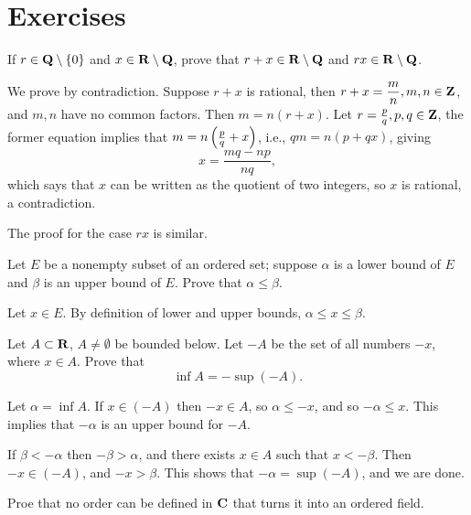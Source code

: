 \section*{Exercises}
\begin{prbm}
If $r\in\mathbf Q\setminus\{0\}$ and $x\in\mathbf R\setminus\mathbf Q$, prove that $r+x\in\mathbf R\setminus\mathbf Q$ and $rx\in\mathbf R\setminus\mathbf Q$.
\end{prbm}

\begin{solution}
We prove by contradiction. Suppose $r+x$ is rational, then $r+x=\dfrac{m}{n},m,n\in\mathbf Z$, and $m,n$ have no common factors. Then $m=n(r+x)$. Let $r=\frac{p}{q},p,q\in\mathbf Z$, the former equation implies that $m=n\left(\frac{p}{q}+x\right)$, i.e., $qm=n(p+qx)$, giving
\[x=\frac{mq-np}{nq},\]
which says that $x$ can be written as the quotient of two integers, so $x$ is rational, a contradiction.

The proof for the case $rx$ is similar.
\end{solution}

\begin{prbm}
Let $E$ be a nonempty subset of an ordered set; suppose $\alpha$ is a lower bound of $E$ and $\beta$ is an upper bound of $E$. Prove that $\alpha\le\beta$.
\end{prbm}

\begin{solution}
Let $x\in E$. By definition of lower and upper bounds, $\alpha\le x\le\beta$.
\end{solution}

\begin{prbm}
Let $A\subset\mathbf R$, $A\neq\emptyset$ be bounded below. Let $-A$ be the set of all numbers $-x$, where $x\in A$. Prove that
\[\inf A=-\sup(-A).\]
\end{prbm}

\begin{solution}
Let $\alpha=\inf A$. If $x\in(-A)$ then $-x\in A$, so $\alpha\le-x$, and so $-\alpha\le x$. This implies that $-\alpha$ is an upper bound for $-A$.

If $\beta<-\alpha$ then $-\beta>\alpha$, and there exists $x\in A$ such that $x<-\beta$. Then $-x\in(-A)$, and $-x>\beta$. This shows that $-\alpha=\sup(-A)$, and we are done.
\end{solution}

\begin{prbm}
Proe that no order can be defined in $\mathbf C$ that turns it into an ordered field.
\end{prbm}

